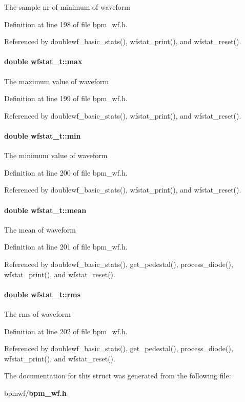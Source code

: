 The sample nr of minimum of waveform 

Definition at line 198 of file bpm\_\-wf.h.

Referenced by doublewf\_\-basic\_\-stats(), wfstat\_\-print(), and wfstat\_\-reset().
\paragraph[max]{\setlength{\rightskip}{0pt plus 5cm}double {\bf wfstat\_\-t::max}}\hfill\label{structwfstat__t_ec3cb4f107dea858fff8be1c0674c598}


The maximum value of waveform 

Definition at line 199 of file bpm\_\-wf.h.

Referenced by doublewf\_\-basic\_\-stats(), wfstat\_\-print(), and wfstat\_\-reset().
\paragraph[min]{\setlength{\rightskip}{0pt plus 5cm}double {\bf wfstat\_\-t::min}}\hfill\label{structwfstat__t_3620e9e451fa4b13d7e0ff9b690acd6a}


The minimum value of waveform 

Definition at line 200 of file bpm\_\-wf.h.

Referenced by doublewf\_\-basic\_\-stats(), wfstat\_\-print(), and wfstat\_\-reset().
\paragraph[mean]{\setlength{\rightskip}{0pt plus 5cm}double {\bf wfstat\_\-t::mean}}\hfill\label{structwfstat__t_04b4e373b3235bef5511c760dc66f4a5}


The mean of waveform 

Definition at line 201 of file bpm\_\-wf.h.

Referenced by doublewf\_\-basic\_\-stats(), get\_\-pedestal(), process\_\-diode(), wfstat\_\-print(), and wfstat\_\-reset().
\paragraph[rms]{\setlength{\rightskip}{0pt plus 5cm}double {\bf wfstat\_\-t::rms}}\hfill\label{structwfstat__t_715e41714d2b81fb030c27326436bfbb}


The rms of waveform 

Definition at line 202 of file bpm\_\-wf.h.

Referenced by doublewf\_\-basic\_\-stats(), get\_\-pedestal(), process\_\-diode(), wfstat\_\-print(), and wfstat\_\-reset().

The documentation for this struct was generated from the following file:\begin{CompactItemize}
\item 
bpmwf/{\bf bpm\_\-wf.h}\end{CompactItemize}
